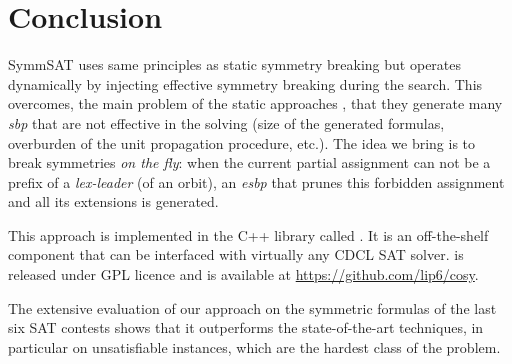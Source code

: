 \section{Conclusion}

SymmSAT uses same principles as static symmetry breaking but operates dynamically by 
injecting effective symmetry breaking during the search.
This overcomes, the main problem of the static approaches , that they
generate many \textit{sbp} that are not effective in the solving (size of the
generated formulas, overburden of the unit propagation procedure, etc.).
The idea we bring is to break symmetries \emph{on the fly}: when the current
partial assignment can not be a prefix of a \textit{lex-leader} (of an orbit),
an \textit{esbp} that prunes this forbidden assignment and all its extensions is generated. 

This approach is implemented in the C++ library called \libdsb{}. It is an
off-the-shelf component that can be interfaced with virtually any CDCL SAT
solver. \libdsb{} is released under GPL licence and is available at
\url{https://github.com/lip6/cosy}.
 
The extensive evaluation of our approach on the symmetric formulas of the last
six SAT contests shows that it outperforms the state-of-the-art techniques, in
particular on unsatisfiable instances, which are the hardest class of the
problem.




